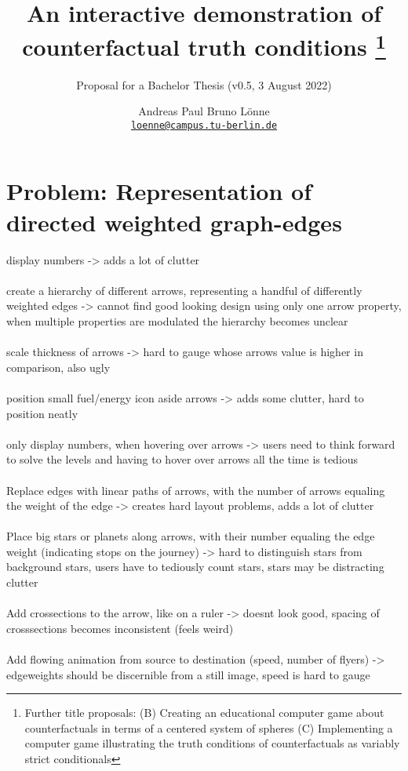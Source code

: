 \documentclass[a4paper,american]{paper}
\providecommand*{\code}[1]{\texttt{#1}}
\begin{document}
\title{An interactive demonstration of counterfactual truth conditions%
	\footnote{Further title proposals:
		(B) Creating an educational computer game about counterfactuals in terms of a centered system of spheres
		(C) Implementing a computer game illustrating the truth conditions of counterfactuals as variably strict conditionals
	}
}

\subtitle{Proposal for a Bachelor Thesis (v0.5, 3 August 2022)}

\author{%
	Andreas Paul Bruno Lönne\\
	\code{\href{mailto:loenne@campus.tu-berlin.de}{loenne@campus.tu-berlin.de}}
}


\maketitle

\section*{Problem: Representation of directed weighted graph-edges}
display numbers -> adds a lot of clutter
\\\\
create a hierarchy of different arrows, representing a handful of differently weighted edges -> cannot find good looking design using only one arrow property, when multiple properties are modulated the hierarchy becomes unclear
\\\\
scale thickness of arrows -> hard to gauge whose arrows value is higher in comparison, also ugly
\\\\
position small fuel/energy icon aside arrows -> adds some clutter, hard to position neatly
\\\\
only display numbers, when hovering over arrows -> users need to think forward to solve the levels and having to hover over arrows all the time is tedious
\\\\
Replace edges with linear paths of arrows, with the number of arrows equaling the weight of the edge -> creates hard layout problems, adds a lot of clutter
\\\\
Place big stars or planets along arrows, with their number equaling the edge weight (indicating stops on the journey) -> hard to distinguish stars from background stars, users have to tediously count stars, stars may be distracting clutter
\\\\
Add crossections to the arrow, like on a ruler -> doesnt look good, spacing of crosssections becomes inconsistent (feels weird)
\\\\
Add flowing animation from source to destination (speed, number of flyers) -> edgeweights should be discernible from a still image, speed is hard to gauge
\end{document}
